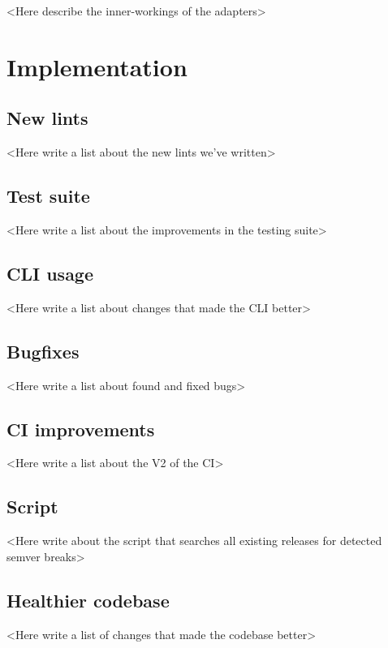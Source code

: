 \documentclass[licencjacka,en]{pracamgr}
\begin{document}
<Here describe the inner-workings of the adapters>



\chapter{Implementation}\label{r:implementation}

\section{New lints}

<Here write a list about the new lints we've written>


\section{Test suite}

<Here write a list about the improvements in the testing suite>


\section{CLI usage}

<Here write a list about changes that made the CLI better>


\section{Bugfixes}

<Here write a list about found and fixed bugs>


\section{CI improvements}

<Here write a list about the V2 of the CI>


\section{Script}

<Here write about the script that searches all existing releases for detected semver breaks>


\section{Healthier codebase}

<Here write a list of changes that made the codebase better>
\end{document}

